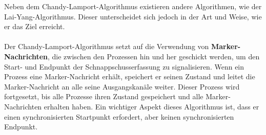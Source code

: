 Neben dem Chandy-Lamport-Algorithmus existieren andere Algorithmen, wie der Lai-Yang-Algorithmus. Dieser unterscheidet sich jedoch in der Art und Weise, wie er das Ziel erreicht.
\\\\
Der Chandy-Lamport-Algorithmus setzt auf die Verwendung von \textbf{Marker-Nachrichten}, die zwischen den Prozessen hin und her geschickt werden, um den Start- und Endpunkt der Schnappschusserfassung zu signalisieren. Wenn ein Prozess eine Marker-Nachricht erhält, speichert er seinen Zustand und leitet die Marker-Nachricht an alle seine Ausgangskanäle weiter. Dieser Prozess wird fortgesetzt, bis alle Prozesse ihren Zustand gespeichert und alle Marker-Nachrichten erhalten haben. Ein wichtiger Aspekt dieses Algorithmus ist, dass er einen synchronisierten Startpunkt erfordert, aber keinen synchronisierten Endpunkt.

